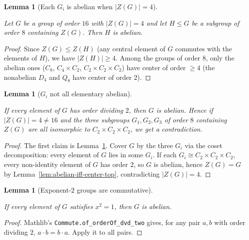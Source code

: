 \documentclass{article}
\newtheorem{lemma}[theorem]{Lemma}
\theoremstyle{definition}
\newcommand{\lean}[1]{}
\newcommand{\leanok}{}
\newcommand{\leanfile}[1]{}
\newcommand{\uses}[1]{}
\begin{document}
\begin{lemma}[Each $G_i$ is abelian when $|Z(G)| = 4$]
    \label{lem:gi-abelian-when-center-four}
    \lean{OrderSixteen.Prelim.gi_abelian_when_center_four}
    \leanfile{M2rGroup7/SixteenCase.lean}
    \leanok
    Let $G$ be a group of order $16$ with $|Z(G)| = 4$ and let $H \le G$ be a
    subgroup of order $8$ containing $Z(G)$. Then $H$ is abelian.
\end{lemma}
\begin{proof}
    Since $Z(G) \le Z(H)$ (any central element of $G$ commutes with the
    elements of $H$), we have $|Z(H)| \ge 4$. Among the groups of order $8$,
    only the abelian ones ($C_8$, $C_4 \times C_2$,
    $C_2 \times C_2 \times C_2$) have center of order $\ge 4$ (the
    nonabelian $D_4$ and $Q_8$ have center of order $2$).
\end{proof}

\begin{lemma}[$G_i$ not all elementary abelian]
    \label{lem:no-all-elementary-abelian}
    \uses{lem:abelian-iff-center-top,lem:order2-implies-abelian}
    If every element of $G$ has order dividing $2$, then $G$ is abelian.
    Hence if $|Z(G)| = 4 \ne 16$ and the three subgroups $G_1, G_2, G_3$ of
    order $8$ containing $Z(G)$ are all isomorphic to
    $C_2 \times C_2 \times C_2$, we get a contradiction.
\end{lemma}
\begin{proof}
    \uses{lem:abelian-iff-center-top,lem:order2-implies-abelian}
    The first claim is Lemma~\ref{lem:order2-implies-abelian}. Cover $G$ by
    the three $G_i$ via the coset decomposition: every element of $G$ lies in
    some $G_i$. If each $G_i \cong C_2 \times C_2 \times C_2$, every
    non-identity element of $G$ has order $2$, so $G$ is abelian, hence
    $Z(G) = G$ by Lemma~\ref{lem:abelian-iff-center-top}, contradicting
    $|Z(G)| = 4$.
\end{proof}

\begin{lemma}[Exponent-$2$ groups are commutative]
    \label{lem:order2-implies-abelian}
    \lean{OrderSixteen.Prelim.order2_implies_abelian}
    \leanfile{M2rGroup7/SixteenCase.lean}
    \leanok
    If every element of $G$ satisfies $x^2 = 1$, then $G$ is abelian.
\end{lemma}
\begin{proof}
    Mathlib's \texttt{Commute.of\_orderOf\_dvd\_two} gives, for any pair
    $a, b$ with order dividing $2$, $a \cdot b = b \cdot a$. Apply it to all
    pairs.
\end{proof}
\end{document}
